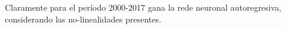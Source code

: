 %	
	
	\begin{figure}[H]
		\centering
		\textbf{}\par\medskip
		\caption{}\label{fig6_2}
	\end{figure}
	

%	
	
	Claramente para el per\'{i}odo 2000-2017 gana la rede neuronal autoregresiva, considerando las no-linealidades presentes.
	
	
	\begin{figure}[H]
		\centering
		\textbf{}\par\medskip
		\caption{}\label{fig6_3}
	\end{figure}
	
